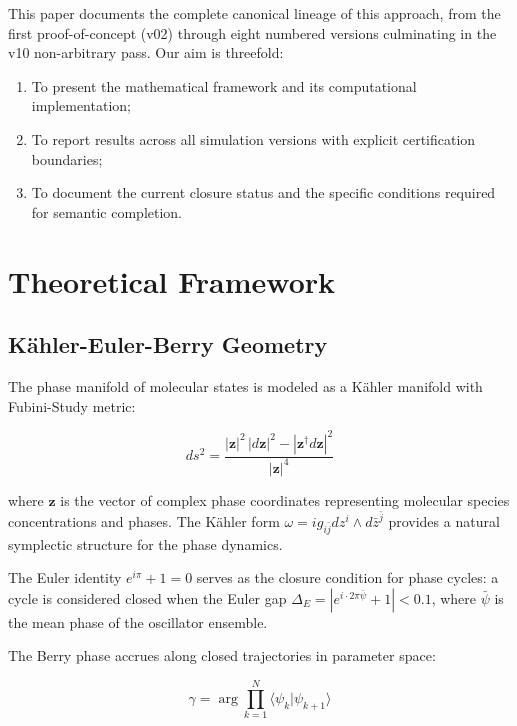\documentclass[11pt,a4paper]{article}
\begin{document}
This paper documents the complete canonical lineage of this approach, from the first proof-of-concept (v02) through eight numbered versions culminating in the v10 non-arbitrary pass. Our aim is threefold:

\begin{enumerate}
    \item To present the mathematical framework and its computational implementation;
    \item To report results across all simulation versions with explicit certification boundaries;
    \item To document the current closure status and the specific conditions required for semantic completion.
\end{enumerate}

\section{Theoretical Framework}

\subsection{K\"ahler-Euler-Berry Geometry}

The phase manifold of molecular states is modeled as a K\"ahler manifold with Fubini-Study metric:

\begin{equation}
ds^2 = \frac{|\mathbf{z}|^2\,|d\mathbf{z}|^2 - |\mathbf{z}^\dagger d\mathbf{z}|^2}{|\mathbf{z}|^4}
\end{equation}

where $\mathbf{z}$ is the vector of complex phase coordinates representing molecular species concentrations and phases. The K\"ahler form $\omega = i g_{i\bar{j}} dz^i \wedge d\bar{z}^{\bar{j}}$ provides a natural symplectic structure for the phase dynamics.

The Euler identity $e^{i\pi} + 1 = 0$ serves as the closure condition for phase cycles: a cycle is considered closed when the Euler gap $\Delta_E = |e^{i\cdot 2\pi\bar{\psi}} + 1| < 0.1$, where $\bar{\psi}$ is the mean phase of the oscillator ensemble.

The Berry phase accrues along closed trajectories in parameter space:

\begin{equation}
\gamma = \arg\prod_{k=1}^{N} \langle \psi_k | \psi_{k+1} \rangle
\end{equation}
\end{document}
